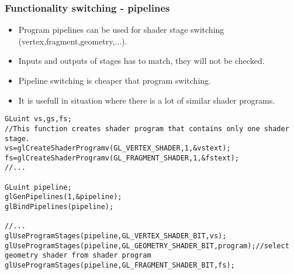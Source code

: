 \begin{frame}[fragile]
\frametitle{Functionality switching - pipelines}
\begin{itemize}
  \item Program pipelines can be used for shader stage switching (vertex,fragment,geometry,...).
  \item Inputs and outputs of stages has to match, they will not be checked.
  \item Pipeline switching is cheaper that program switching.
  \item It is usefull in situation where there is a lot of similar shader programs.
\end{itemize}
{\tiny
\begin{verbatim}
GLuint vs,gs,fs;
//This function creates shader program that contains only one shader stage.
vs=glCreateShaderProgramv(GL_VERTEX_SHADER,1,&vstext);
fs=glCreateShaderProgramv(GL_FRAGMENT_SHADER,1,&fstext);
//...

GLuint pipeline;
glGenPipelines(1,&pipeline);
glBindPipelines(pipeline);

//...
glUseProgramStages(pipeline,GL_VERTEX_SHADER_BIT,vs);
glUseProgramStages(pipeline,GL_GEOMETRY_SHADER_BIT,program);//select geometry shader from shader program
glUseProgramStages(pipeline,GL_FRAGMENT_SHADER_BIT,fs);
\end{verbatim}
}
\end{frame}

